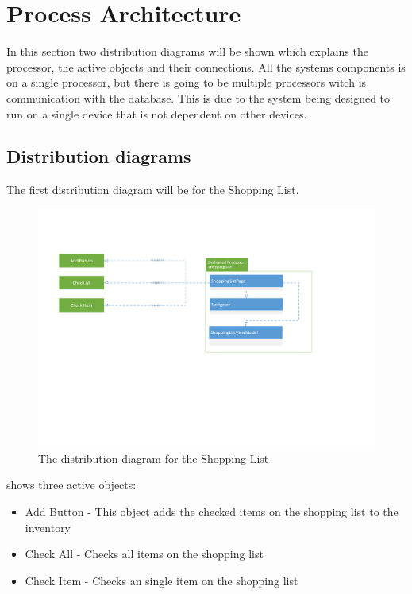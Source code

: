 \section{Process Architecture}
In this section two distribution diagrams will be shown which explains the processor, the active objects and their connections. All the systems components is on a single processor, but there is going to be multiple processors witch is communication with the database. This is due to the system being designed to run on a single device that is not dependent on other devices.

\subsection{Distribution diagrams}
The first distribution diagram will be for the Shopping List.

\begin{figure}[H]
\includegraphics[width=\linewidth]{Grafik/FoodPlanner/DistributionShoppingList}
\centering
\caption{The distribution diagram for the Shopping List}
\label{SLD}
\end{figure}

 shows three active objects:
\begin{itemize}
\item Add Button 
- This object adds the checked items on the shopping list to the inventory
\item Check All 
- Checks all items on the shopping list 
\item Check Item 
- Checks an single item on the shopping list
\end{itemize}

